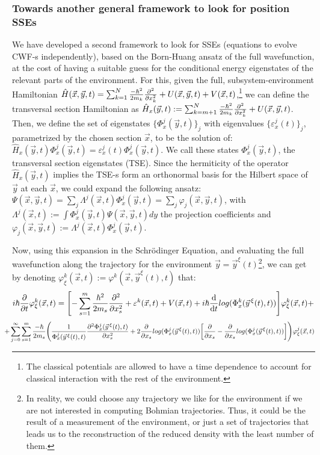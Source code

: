 \documentclass[11pt, a4paper]{article} %
\begin{document}
\subsubsection*{Towards another general framework to look for position SSEs}
We have developed a second framework to look for SSEs (equations to evolve CWF-s independently), based on the Born-Huang ansatz of the full wavefunction, at the cost of having a suitable guess for the conditional energy eigenstates of the relevant parts of the environment. For this, given the full, subsystem-environment Hamiltonian $\hat{H}(\vec{x},\vec{y},t)=\sum_{k=1}^N \frac{-\hbar^2}{2m_k}\pdv[2]{}{x_k} + U(\vec{x},\vec{y},t)+V(\vec{x},t)$,\footnote{The classical potentials are allowed to have a time dependence to account for classical interaction with the rest of the environment.} we can define the transversal section Hamiltonian as $\hat{H}_x(\vec{y},t):=\sum_{k=m+1}^N\frac{-\hbar^2}{2m_k}\pdv[2]{}{x_k}+U(\vec{x},\vec{y},t)$. Then, we define the set of eigenstates $\{\Phi^j_x(\vec{y},t)\}_j$ with eigenvalues $\{\varepsilon_x^j(t)\}_j$, parametrized by the chosen section $\vec{x}$, to be the solution of: $\hat{H}_x(\vec{y},t)\Phi^j_x(\vec{y},t)=\varepsilon_x^j(t)\Phi^j_x(\vec{y},t)$. We call these states $\Phi^j_x(\vec{y},t)$, the transversal section eigenstates (TSE). Since the hermiticity of the operator $\hat{H}_x(\vec{y},t)$ implies the TSE-s form an orthonormal basis for the Hilbert space of $\vec{y}$ at each $\vec{x}$, we could expand the following ansatz: $\Psi(\vec{x},\vec{y},t)=\sum_j \Lambda^j(\vec{x},t)\Phi_x^j(\vec{y},t)=\sum_j \varphi_j(\vec{x},\vec{y},t)$, with $\Lambda^j(\vec{x},t):=\int\Phi^j_x(\vec{y},t)\Psi(\vec{x},\vec{y},t)dy$ the projection coefficients and $\varphi_j(\vec{x},\vec{y},t):=\Lambda^j(\vec{x},t)\Phi^j_x(\vec{y},t)$.

Now, using this expansion in the Schrödinger Equation, and evaluating the full wavefunction along the trajectory for the environment $\vec{y}=\vec{y}^\xi(t)$\footnote{In reality, we could choose any trajectory we like for the environment if we are not interested in computing Bohmian trajectories. Thus, it could be the result of a measurement of the environment, or just a set of trajectories that leads us to the reconstruction of the reduced density with the least number of them.}, we can get by denoting $\varphi^k_\xi(\vec{x},t):=\varphi^k(\vec{x},\vec{y}^\xi(t),t)$ that:
\begin{equation}
 i\hbar\pdv{}{t}\varphi^k_\xi(\vec{x},t)=\qty[-\sum_{s=1}^m\frac{\hbar^2}{2m_s}\pdv[2]{}{x_s}+ \varepsilon^k(\vec{x},t)+V(\vec{x},t)   +i\hbar \dv{}{t}log(\Phi^k_x(\vec{y}^{\, \xi}(t),t))]\varphi^k_\xi(\vec{x},t)+
\end{equation}
$$
\hspace{-0.4cm}+\sum_{j=0}^\infty\sum_{s=1}^m \frac{-\hbar}{2m_s}\qty( \frac{1}{\Phi^j_x(\vec{y}^{\, \xi}(t),t)}\pdv[2]{\Phi^j_x(\vec{y}^{\, \xi}(t),t)}{x_s}+2\pdv{}{x_s}log(\Phi^j_x(\vec{y}^{\, \xi}(t),t))\qty[\pdv{}{x_s}-\pdv{}{x_s}log(\Phi^j_x(\vec{y}^{\, \xi}(t),t))] )\varphi^j_\xi(\vec{x},t)
$$
\end{document}

